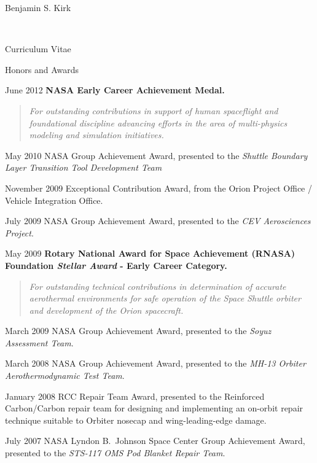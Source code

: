 \documentclass[10pt]{report}
\begin{document}
\begin{cv}{\centerline{\Large Benjamin S. Kirk}\\
    \centerline{\large Curriculum Vitae}}
  \begin{cvlist}{Honors and Awards}

    \item[June 2012]
      \textbf{NASA Early Career Achievement Medal.}

      \begin{quote}
        \em For outstanding contributions in support of human spaceflight and foundational discipline advancing efforts in the area of multi-physics modeling and simulation initiatives.
      \end{quote}

    \item[May 2010]
      NASA Group Achievement Award, presented to the {\em Shuttle Boundary Layer Transition Tool Development Team}

    \item[November 2009]
      Exceptional Contribution Award, from the Orion Project Office / Vehicle Integration Office.

    \item[July 2009]
    NASA Group Achievement Award, presented to the {\em CEV Aerosciences Project}.

    \item[May 2009]
      \textbf{Rotary National Award for Space Achievement (RNASA) Foundation {\em Stellar Award} - Early Career Category.}
      \begin{quote}
        \em For outstanding technical contributions in determination of accurate aerothermal environments for safe operation of the Space Shuttle orbiter and development of the Orion spacecraft.
      \end{quote}


    \item[March 2009]
    NASA Group Achievement Award, presented to the {\em Soyuz Assessment Team}.

    \item[March 2008]
    NASA Group Achievement Award, presented to the {\em MH-13 Orbiter Aerothermodynamic Test Team}.

    \item[January 2008]
     RCC Repair Team Award, presented to the Reinforced Carbon/Carbon repair team for designing and implementing an on-orbit repair technique suitable to Orbiter nosecap and wing-leading-edge damage.

    \item[July 2007]
      NASA Lyndon B.~Johnson Space Center Group Achievement Award, presented to the {\em STS-117 OMS Pod Blanket Repair Team}.


\end{cvlist}
\end{cv}
\end{document}
